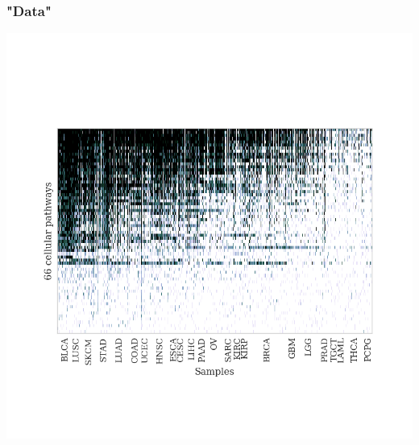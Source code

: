 \documentclass[11pt]{article}
\begin{document}
\subsubsection*{"Data"}
\label{sec-4-9-2}
\includegraphics[width=.9\linewidth]{./fa_data_prob.png}
\end{document}
